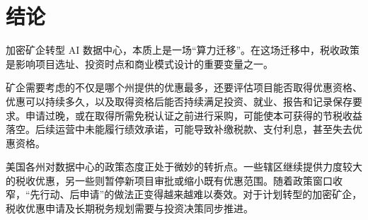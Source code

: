 \section{结论}

加密矿企转型 AI 数据中心，本质上是一场“算力迁移”。在这场迁移中，税收政策是影响项目选址、投资时点和商业模式设计的重要变量之一。

矿企需要考虑的不仅是哪个州提供的优惠最多，还要评估项目能否取得优惠资格、优惠可以持续多久，以及取得资格后能否持续满足投资、就业、报告和记录保存要求。申请过晚，或在取得所需免税认证之前进行采购，可能使本可获得的节税收益落空。后续运营中未能履行绩效承诺，可能导致补缴税款、支付利息，甚至失去优惠资格。

美国各州对数据中心的政策态度正处于微妙的转折点。一些辖区继续提供力度较大的税收优惠，另一些则暂停新项目审批或缩小既有优惠范围。随着政策窗口收窄，“先行动、后申请”的做法正变得越来越难以奏效。对于计划转型的加密矿企，税收优惠申请及长期税务规划需要与投资决策同步推进。

\FloatBarrier
